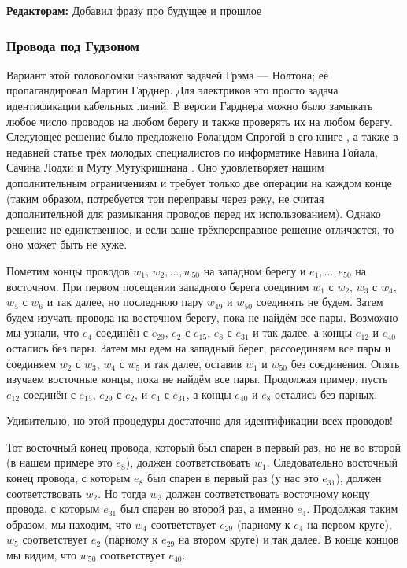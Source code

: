 \begin{addedbytheeditors}
\textbf{Редакторам:} Добавил фразу про будущее и прошлое
\end{addedbytheeditors}


\subsubsection*{Провода под Гудзоном}

Вариант этой головоломки называют задачей Грэма --- Нолтона;
её пропагандировал Мартин Гарднер.
Для электриков это просто задача идентификации кабельных линий.
В версии Гарднера можно было замыкать любое число проводов на любом берегу и также проверять их на любом берегу.
Следующее решение было предложено Роландом Спрэгой в его книге \cite{54}, а также в недавней статье трёх молодых специалистов по информатике Навина Гойала, Сачина Лодхи и Муту Мутукришнана \cite{33}.
Оно удовлетворяет нашим дополнительным ограничениям и требует только две операции на каждом конце (таким образом, потребуется три переправы через реку, не считая дополнительной для размыкания проводов перед их использованием).
Однако решение не единственное, и если ваше трёхпереправное решение отличается, то оно может быть не хуже.

Пометим концы проводов $w_1$, $w_2, \dots, w_{50}$ на западном берегу
и $e_1, \dots, e_{50}$ на восточном. %
При первом посещении западного берега соединим $w_1$ с $w_2$, $w_3$ с $w_4$, $w_5$ с $w_6$ и так далее, но последнюю пару $w_{49}$ и $w_{50}$ соединять не будем.
Затем будем изучать провода на восточном берегу, пока не найдём все пары.
Возможно мы узнали, что $e_4$ соединён с $e_{29}$, $e_2$ с $e_{15}$, $e_8$ с $e_{31}$ и так далее, а концы $e_{12}$ и $e_{40}$ остались без пары.
Затем мы едем на западный берег, рассоединяем все пары и соединяем $w_2$ с $w_3$, $w_4$ с $w_5$ и так далее, оставив $w_1$ и $w_{50}$ без соединения.
Опять изучаем восточные концы, пока не найдём все пары.
Продолжая пример, пусть $e_{12}$ соединён с $e_{15}$, $e_{29}$ с $e_2$, и $e_4$ с $e_{31}$, а концы $e_{40}$ и $e_8$ остались без парных.

Удивительно, но этой процедуры достаточно для идентификации всех проводов!

Тот восточный конец провода, который был спарен в первый раз, но не во второй (в нашем примере это $e_8$), должен соответствовать $w_1$.
Следовательно восточный конец провода, с которым $e_8$ был спарен в первый раз (у нас это $e_{31}$), должен соответствовать $w_2$.
Но тогда $w_3$ должен соответствовать восточному концу провода, с которым $e_{31}$ был спарен во второй раз, а именно $e_4$.
Продолжая таким образом, мы находим, что $w_4$ соответствует $e_{29}$ (парному к $e_4$ на первом круге), $w_5$ соответствует $e_2$ (парному к $e_{29}$ на втором круге) и так далее.
В конце концов мы видим, что $w_{50}$ соответствует $e_{40}$.

